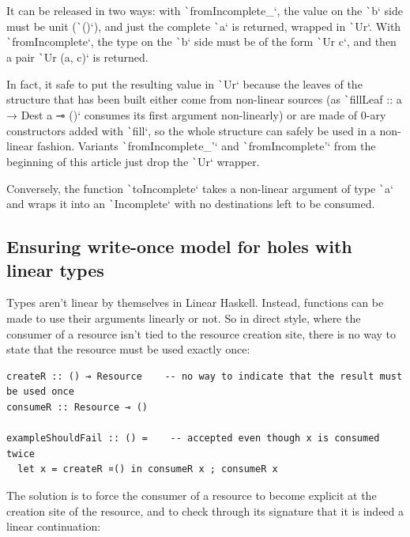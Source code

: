 \documentclass[english]{jflart}
\newlength{\currentparskip}
\newenvironment{unbreakable}
{%
  \setlength{\currentparskip}{\parskip}%
  \setlength{\parskip}{\currentparskip}%
  \par\vspace{0.5\baselineskip}%
  \noindent\begin{minipage}{\textwidth}%
    \setlength{\parskip}{\currentparskip}%
}
{%
  \end{minipage}%
  \par\vspace{0.5\baselineskip}%
}
\begin{document}
It can be released in two ways: with \texttt`fromIncomplete_`, the value on the \texttt`b` side must be unit (\texttt`()`), and just the complete \texttt`a` is returned, wrapped in \texttt`Ur`. With \texttt`fromIncomplete`, the type on the \texttt`b` side must be of the form \texttt`Ur c`, and then a pair \texttt`Ur (a, c)` is returned.

In fact, it safe to put the resulting value in \texttt`Ur` because the leaves of the structure that has been built either come from non-linear sources (as \texttt`fillLeaf :: a → Dest a ⊸ ()` consumes its first argument non-linearly) or are made of 0-ary constructors added with \texttt`fill`, so the whole structure can safely be used in a non-linear fashion. Variants \texttt`fromIncomplete_'` and \texttt`fromIncomplete'` from the beginning of this article just drop the \texttt`Ur` wrapper.

Conversely, the function \texttt`toIncomplete` takes a non-linear argument of type \texttt`a` and wraps it into an \texttt`Incomplete` with no destinations left to be consumed.

\subsection{Ensuring write-once model for holes with linear types}\label{ssec:api-linearity}

Types aren't linear by themselves in Linear Haskell. Instead, functions can be made to use their arguments linearly or not. So in direct style, where the consumer of a resource isn't tied to the resource creation site, there is no way to state that the resource must be used exactly once:

\begin{unbreakable}
{\small
\begin{verbatim}
createR :: () ⊸ Resource    -- no way to indicate that the result must be used once
consumeR :: Resource ⊸ ()

exampleShouldFail :: () =    -- accepted even though x is consumed twice
  let x = createR ¤() in consumeR x ; consumeR x
\end{verbatim}
}
\end{unbreakable}

The solution is to force the consumer of a resource to become explicit at the creation site of the resource, and to check through its signature that it is indeed a linear continuation:
\end{document}
